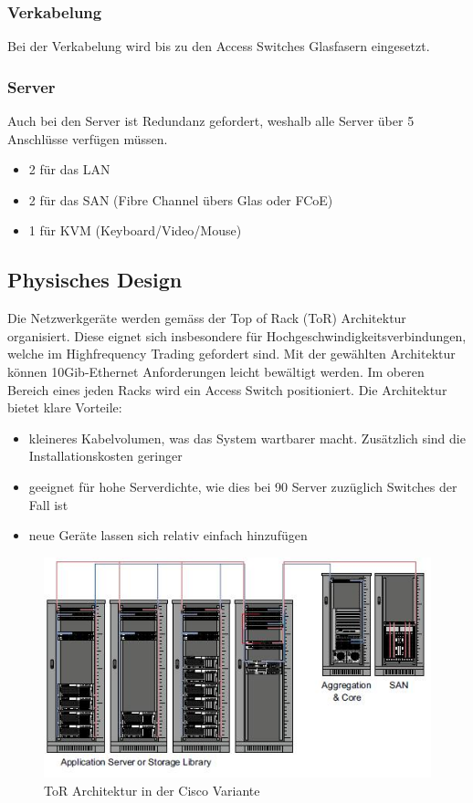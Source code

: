 \subsubsection{Verkabelung}
Bei der Verkabelung wird bis zu den Access Switches Glasfasern eingesetzt. 

\subsubsection{Server}
Auch bei den Server ist Redundanz gefordert, weshalb alle Server über 5 Anschlüsse verfügen müssen. 
\begin{itemize}
	\item 2 für das LAN 
	\item 2 für das SAN (Fibre Channel übers Glas oder FCoE)
	\item 1 für KVM (Keyboard/Video/Mouse)
\end{itemize}

\subsection{Physisches Design}
Die Netzwerkgeräte werden gemäss der Top of Rack (ToR) Architektur organisiert. Diese eignet sich insbesondere für Hochgeschwindigkeitsverbindungen, welche im Highfrequency Trading gefordert sind. Mit der gewählten Architektur können 10Gib-Ethernet Anforderungen leicht bewältigt werden. Im oberen Bereich eines jeden Racks wird ein Access Switch positioniert. Die Architektur bietet klare Vorteile:
\begin{itemize}
	\item kleineres Kabelvolumen, was das System wartbarer macht. Zusätzlich sind die Installationskosten geringer
	\item geeignet für hohe Serverdichte, wie dies bei 90 Server zuzüglich Switches der Fall ist
	\item neue Geräte lassen sich relativ einfach hinzufügen
\end{itemize}

\begin{figure}[h]
\centering
\includegraphics[width=0.5\linewidth]{images/tor_architecture}
\caption{ToR Architektur in der Cisco Variante}
\label{fig:torarchitecture}
\end{figure}


